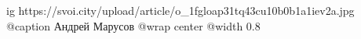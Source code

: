  
 
 
 
 

\ifcmt
  ig https://svoi.city/upload/article/o_1fgloap31tq43cu10b0b1a1iev2a.jpg
  @caption Андрей Марусов
  @wrap center
  @width 0.8
\fi
